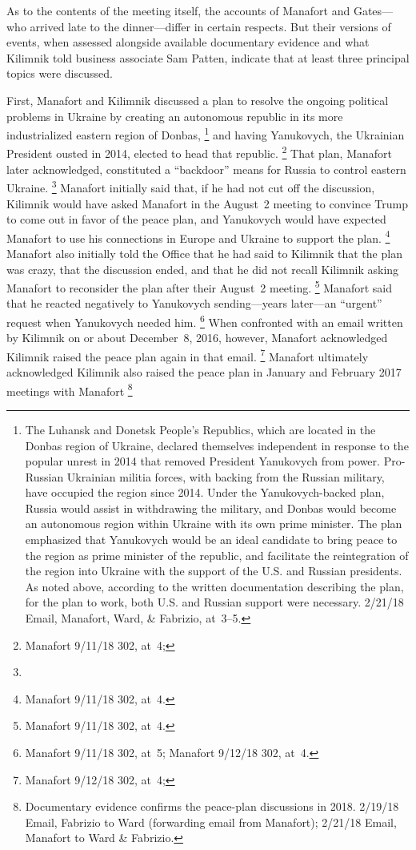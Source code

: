As to the contents of the meeting itself, the accounts of Manafort and Gates---who arrived late to the dinner---differ in certain respects.
But their versions of events, when assessed alongside available documentary evidence and what Kilimnik told business associate Sam Patten, indicate that at least three principal topics were discussed.

First, Manafort and Kilimnik discussed a plan to resolve the ongoing political problems in Ukraine by creating an autonomous republic in its more industrialized eastern region of Donbas,%
\footnote{The Luhansk and Donetsk People's Republics, which are located in the Donbas region of Ukraine, declared themselves independent in response to the popular unrest in 2014 that removed President Yanukovych from power.
Pro-Russian Ukrainian militia forces, with backing from the Russian military, have occupied the region since 2014.
Under the Yanukovych-backed plan, Russia would assist in withdrawing the military, and Donbas would become an autonomous region within Ukraine with its own prime minister.
The plan emphasized that Yanukovych would be an ideal candidate to bring peace to the region as prime minister of the republic, and facilitate the reintegration of the region into Ukraine with the support of the U.S. and Russian presidents.
As noted above, according to  the written documentation describing the plan, for the plan to work, both U.S. and Russian support were necessary.
 2/21/18 Email, Manafort, Ward, \& Fabrizio, at~3--5.}
and having Yanukovych, the Ukrainian President ousted in 2014, elected to head that republic.%
\footnote{Manafort 9/11/18 302, at~4; }
That plan, Manafort later acknowledged, constituted a ``backdoor'' means for Russia to control eastern Ukraine.%
\footnote{}
Manafort initially said that, if he had not cut off the discussion, Kilimnik would have asked Manafort in the August~2 meeting to convince Trump to come out in favor of the peace plan, and Yanukovych would have expected Manafort to use his connections in Europe and Ukraine to support the plan.%
\footnote{Manafort 9/11/18 302, at~4.}
Manafort also initially told the Office that he had said to Kilimnik that the plan was crazy, that the discussion ended, and that he did not recall Kilimnik asking Manafort to reconsider the plan after their August~2 meeting.%
\footnote{Manafort 9/11/18 302, at~4.}
Manafort said
that he reacted negatively to Yanukovych sending---years later---an ``urgent'' request when Yanukovych needed him.%
\footnote{ Manafort 9/11/18 302, at~5;
Manafort 9/12/18 302, at~4.}
When confronted with an email written by Kilimnik on or about December~8, 2016, however, Manafort acknowledged Kilimnik raised the peace plan again in that email.%
\footnote{Manafort 9/12/18 302, at~4; }
Manafort ultimately acknowledged Kilimnik also raised the peace plan in January and February 2017 meetings with Manafort
\footnote{ Documentary evidence confirms the peace-plan discussions in 2018.
2/19/18 Email, Fabrizio to Ward (forwarding email from Manafort);
2/21/18 Email, Manafort to Ward \& Fabrizio.}

